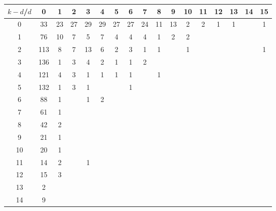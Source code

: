 \documentclass{article}[12pt]
\begin{document}
\begin{landscape}

\begin{table}[h]\footnotesize
{\centering
\begin{tabular}{|c|c|
c|c|c|c|c|c|c|c|c|c|c|c|c|c|c|}
  \hline
  $k-d$/$d$ 
 & 0 & 1 & 2 & 3 & 4 & 5 & 6 & 7 & 8 & 9 & 10 & 11 & 12 & 13 & 14 & 15\\

  \hline
  \hline

0  & 33 & 23 & 27 & 29 & 29 & 27 & 27 & 24 & 11 & 13 & 2 & 2 & 1 & 1 &  & 1\\

1  & 76 & 10 & 7 & 5 & 7 & 4 & 4 & 4 & 1 & 2 & 2 &  &  &  &  & \\

2  & 113 & 8 & 7 & 13 & 6 & 2 & 3 & 1 & 1 &  & 1 &  &  &  &  & 1\\

3  & 136 & 1 & 3 & 4 & 2 & 1 & 1 & 2 &  &  &  &  &  &  &  & \\

4  & 121 & 4 & 3 & 1 & 1 & 1 & 1 &  & 1 &  &  &  &  &  &  & \\

5  & 132 & 1 & 3 & 1 &  &  & 1 &  &  &  &  &  &  &  &  & \\

6  & 88 & 1 &  & 1 & 2 &  &  &  &  &  &  &  &  &  &  & \\

7  & 61 & 1 &  &  &  &  &  &  &  &  &  &  &  &  &  & \\

8  & 42 & 2 &  &  &  &  &  &  &  &  &  &  &  &  &  & \\

9  & 21 & 1 &  &  &  &  &  &  &  &  &  &  &  &  &  & \\

10  & 20 & 1 &  &  &  &  &  &  &  &  &  &  &  &  &  & \\

11  & 14 & 2 &  & 1 &  &  &  &  &  &  &  &  &  &  &  & \\

12  & 15 & 3 &  &  &  &  &  &  &  &  &  &  &  &  &  & \\

13  & 2 &  &  &  &  &  &  &  &  &  &  &  &  &  &  & \\

14  & 9 &  &  &  &  &  &  &  &  &  &  &  &  &  &  & \\


\end{tabular}}
\end{table}
\end{landscape}
\end{document}
